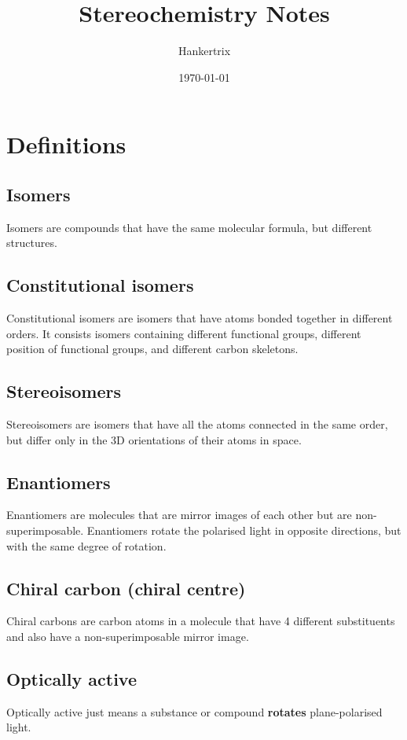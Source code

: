 \documentclass[11pt]{article}
\author{Hankertrix}
\date{\today}
\title{Stereochemistry Notes}
\begin{document}
\maketitle
\setcounter{tocdepth}{2}
\tableofcontents \clearpage\section{Definitions}
\label{sec:org88fd562}

\subsection{Isomers}
\label{sec:org22fe0c2}
Isomers are compounds that have the same molecular formula, but different structures.
\subsection{Constitutional isomers}
\label{sec:org829af7f}
Constitutional isomers are isomers that have atoms bonded together in different orders. It consists isomers containing different functional groups, different position of functional groups, and different carbon skeletons.
\subsection{Stereoisomers}
\label{sec:org17320c1}
Stereoisomers are isomers that have all the atoms connected in the same order, but differ only in the 3D orientations of their atoms in space.
\subsection{Enantiomers}
\label{sec:org91374bd}
Enantiomers are molecules that are mirror images of each other but are non-superimposable. Enantiomers rotate the polarised light in opposite directions, but with the same degree of rotation.
\subsection{Chiral carbon (chiral centre)}
\label{sec:org080bebb}
Chiral carbons are carbon atoms in a molecule that have 4 different substituents and also have a non-superimposable mirror image.
\subsection{Optically active}
\label{sec:org872d676}
Optically active just means a substance or compound \textbf{rotates} plane-polarised light.
\end{document}
